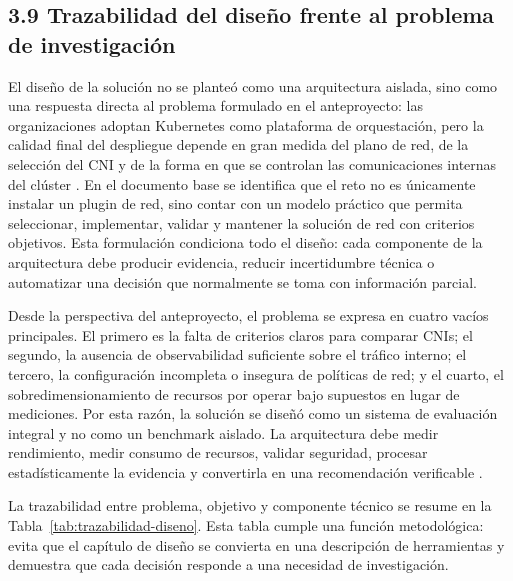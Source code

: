 \subsection{3.9 Trazabilidad del diseño frente al problema de investigación}

El diseño de la solución no se planteó como una arquitectura aislada, sino como una respuesta directa al problema formulado en el anteproyecto: las organizaciones adoptan Kubernetes como plataforma de orquestación, pero la calidad final del despliegue depende en gran medida del plano de red, de la selección del CNI y de la forma en que se controlan las comunicaciones internas del clúster \cite{ref29}. En el documento base se identifica que el reto no es únicamente instalar un plugin de red, sino contar con un modelo práctico que permita seleccionar, implementar, validar y mantener la solución de red con criterios objetivos. Esta formulación condiciona todo el diseño: cada componente de la arquitectura debe producir evidencia, reducir incertidumbre técnica o automatizar una decisión que normalmente se toma con información parcial.

Desde la perspectiva del anteproyecto, el problema se expresa en cuatro vacíos principales. El primero es la falta de criterios claros para comparar CNIs; el segundo, la ausencia de observabilidad suficiente sobre el tráfico interno; el tercero, la configuración incompleta o insegura de políticas de red; y el cuarto, el sobredimensionamiento de recursos por operar bajo supuestos en lugar de mediciones. Por esta razón, la solución se diseñó como un sistema de evaluación integral y no como un benchmark aislado. La arquitectura debe medir rendimiento, medir consumo de recursos, validar seguridad, procesar estadísticamente la evidencia y convertirla en una recomendación verificable \cite{ref29}.

La trazabilidad entre problema, objetivo y componente técnico se resume en la Tabla~\ref{tab:trazabilidad-diseno}. Esta tabla cumple una función metodológica: evita que el capítulo de diseño se convierta en una descripción de herramientas y demuestra que cada decisión responde a una necesidad de investigación.

